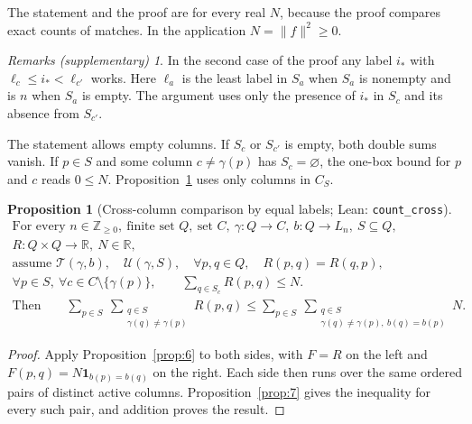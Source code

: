 \documentclass[11pt]{amsart}
\newcommand{\lean}[1]{\texttt{#1}}
\newcommand{\notlean}{supplementary}
\newtheorem{proposition}{Proposition}
\theoremstyle{definition}
\theoremstyle{remark}
\newtheorem*{remarks}{Remarks \textup{(\notlean)}}
\begin{document}
The statement and the proof are for every real \(N\), because the proof
compares exact counts of matches. In the application \(N=\|f\|^2\ge0\).

\begin{remarks}
In the second case of the proof any label \(i_*\) with
\(\ell_c\le i_*<\ell_{c'}\) works. Here \(\ell_a\) is the least label in
\(S_a\) when \(S_a\) is nonempty and is \(n\) when \(S_a\) is empty. The
argument uses only the presence of \(i_*\) in \(S_c\) and its absence from
\(S_{c'}\).

The statement allows empty columns. If \(S_c\) or \(S_{c'}\) is empty,
both double sums vanish. If \(p\in S\) and some column \(c\ne\gamma(p)\) has
\(S_c=\varnothing\), the one-box bound for \(p\) and \(c\) reads \(0\le N\).
Proposition~\ref{prop:8} uses only columns in \(C_S\).
\end{remarks}

\begin{proposition}[Cross-column comparison by equal labels; Lean: \lean{count\_\allowbreak{}cross}]\label{prop:8}
\[
\begin{gathered}
\text{For every }n\in\mathbb Z_{\ge0},\ \text{finite set }Q,\ \text{set }C,\
\gamma:Q\to C,\ b:Q\to L_n,\ S\subseteq Q,\\
R:Q\times Q\to\mathbb R,\ N\in\mathbb R,\\
\text{assume }\mathcal T(\gamma,b),\quad\mathcal U(\gamma,S),\quad
\forall p,q\in Q,\quad R(p,q)=R(q,p),\\
\forall p\in S,\ \forall c\in C\setminus\{\gamma(p)\},\qquad
\sum_{q\in S_c}R(p,q)\le N.
\\
\text{Then}\qquad
\sum_{p\in S}\ \sum_{\substack{q\in S\\\gamma(q)\ne\gamma(p)}} R(p,q)
\le
\sum_{p\in S}\ \sum_{\substack{q\in S\\\gamma(q)\ne\gamma(p),\ b(q)=b(p)}}N .
\end{gathered}
\]
\end{proposition}

\begin{proof}
Apply Proposition~\ref{prop:6} to both sides, with \(F=R\) on the left and
\(F(p,q)=N\mathbf 1_{b(p)=b(q)}\) on the right. Each side then runs over the
same ordered pairs of distinct active columns. Proposition~\ref{prop:7} gives
the inequality for every such pair, and addition proves the result.
\end{proof}
\end{document}
